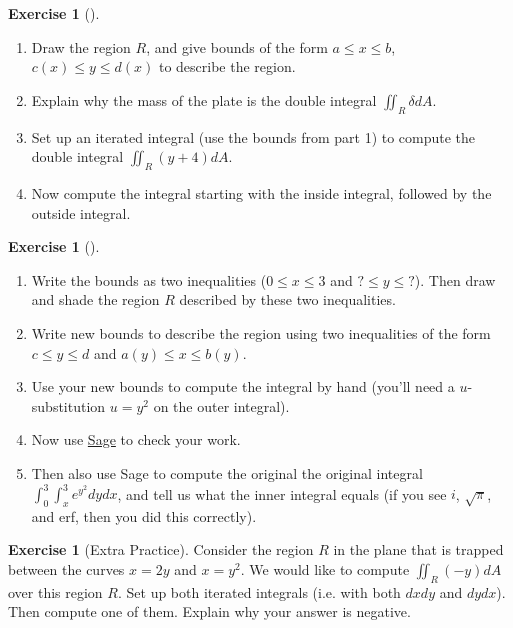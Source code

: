 \documentclass[10pt,]{book}
\theoremstyle{plain}
\theoremstyle{definition}
\theoremstyle{definition}
\theoremstyle{definition}
\theoremstyle{definition}
\newtheorem{exploration}[project]{Exercise}
\theoremstyle{definition}
\numberwithin{equation}{section}
\newcommand{\ds}{\displaystyle}
\begin{document}
\begin{exploration}[]\label{exploration-250}
\leavevmode%
\begin{enumerate}[font=\bfseries,label=(\alph*),ref=\alph*]
\item\label{task-681} Draw the region \(R\), and give bounds of the form \(a\leq x\leq b\), \(c(x)\leq y\leq d(x)\) to describe the region.%
\item\label{task-682} Explain why the mass of the plate is the double integral \(\ds\iint_R \delta dA\).%
\item\label{task-683} Set up an iterated integral (use the bounds from part 1) to compute the double integral \(\ds\iint_R (y+4) dA\).%
\item\label{task-684} Now compute the integral starting with the inside integral, followed by the outside integral.%
\end{enumerate}
\end{exploration}
\begin{exploration}[]\label{exploration-251}
\leavevmode%
\begin{enumerate}[font=\bfseries,label=(\alph*),ref=\alph*]
\item\label{task-685} Write the bounds as two inequalities (\(0\leq x\leq 3\) and \(?\leq y\leq ?\)). Then draw and shade the region \(R\) described by these two inequalities.%
\item\label{task-686} Write new bounds to describe the region using two inequalities of the form \(c\leq y\leq d\) and \(a(y)\leq x\leq b(y)\).%
\item\label{task-687} Use your new bounds to compute the integral by hand (you'll need a \(u\)-substitution \(u=y^2\) on the outer integral).%
\item\label{task-688} Now use \href{http://bmw.byuimath.com/dokuwiki/doku.php?id=double_integral_calculator}{Sage} to check your work.%
\item\label{task-689} Then also use Sage to compute the original the original integral \(\ds \int_0^3\int_x^3 e^{y^2}dydx\), and tell us what the inner integral equals (if you see \(i\), \(\sqrt{\pi}\), and erf, then you did this correctly).%
\end{enumerate}
\end{exploration}
\begin{exploration}[Extra Practice]\label{exploration-252}
Consider the region \(R\) in the plane that is trapped between the curves \(x=2y\) and \(x=y^2\). We would like to compute \(\iint_R (-y) dA\) over this region \(R\). Set up both iterated integrals (i.e. with both \(dxdy\) and \(dydx\)). Then compute one of them. Explain why your answer is negative.%
\end{exploration}
\typeout{************************************************}
\typeout{************************************************}
\end{document}
